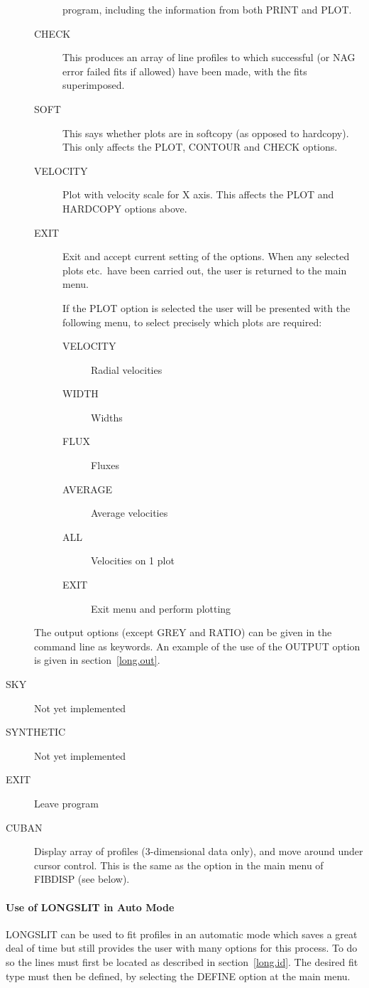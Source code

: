 \documentclass[11pt,twoside]{article}
\begin{document}
\begin{description}
\begin{description}
program, including the information from both PRINT and PLOT.
\item[CHECK] This produces an array of line profiles to which successful
(or NAG error failed fits if allowed) have been made, with the fits
superimposed.
\item[SOFT] This says whether plots are in softcopy (as opposed to
hardcopy). This only affects the PLOT, CONTOUR and CHECK options.
\item[VELOCITY] Plot with velocity scale for X axis. This affects the PLOT
and HARDCOPY options above.
\item[EXIT] Exit and accept current setting of the options.
When any selected plots etc.\ have been carried out, the user is
returned to the main menu.

If the PLOT option is selected the user will be presented with the
following menu, to select precisely which plots are required:
\begin{description}
\item[VELOCITY] Radial velocities
\item[WIDTH] Widths
\item[FLUX] Fluxes
\item[AVERAGE] Average velocities
\item[ALL] Velocities on 1 plot
\item[EXIT] Exit menu and perform plotting
\end{description}
\end{description}
The output options (except GREY and RATIO) can be given in the command
line as keywords.
An example of the use of the OUTPUT option is given in
section~\ref{long.out}.
\item[SKY] Not yet implemented
\item[SYNTHETIC] Not yet implemented
\item[EXIT] Leave program
\item[CUBAN] Display array of profiles (3-dimensional data only), and move
around under cursor control. This is the same as the option in the main menu
of FIBDISP (see below).
\end{description}

\paragraph{Use of LONGSLIT in Auto Mode}

LONGSLIT can be used to fit profiles in an automatic mode which saves
a great deal of time but still provides the user with many options for
this process.
To do so the lines must first be located as described in
section~\ref{long.id}.
The desired fit type must then be defined, by selecting the DEFINE
option at the main menu.
\end{document}

